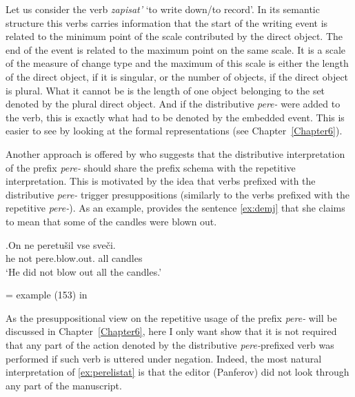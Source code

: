 Let us consider the verb \textit{zapisat'} `to write down/to record'. In its semantic structure this verbs carries information that the start of the writing event is related to the minimum point of the scale contributed by the direct object. The end of the event is related to the maximum point on the same scale. It is a scale of the measure of change type and the maximum of this scale is either the length of the direct object, if it is singular, or the number of objects, if the direct object is plural. What it cannot be is the length of one object belonging to the set denoted by the plural direct object. And if the distributive \textit{pere-} were added to the verb, this is exactly what had to be denoted by the embedded event. This is easier to see by looking at the formal representations (see Chapter~\ref{Chapter6}).

Another approach is offered by \citet{Demjjanow:97} who suggests that the distributive interpretation of the prefix \textit{pere-} should share the prefix schema with the repetitive interpretation. This is motivated by the idea that verbs prefixed with the distributive \textit{pere-} trigger presuppositions (similarly to the verbs prefixed with the repetitive \textit{pere-}). As an example, \citet{Demjjanow:97} provides the sentence \ref{ex:demj} that she claims to mean that some of the candles were blown out.

\exg.\label{ex:demj}On ne peretu\v{s}il vse sve\v{c}i.\\
he not pere.blow.out. all candles\\
\vspace{0.5em}
`He did not blow out all the candles.'\\
\begin{flushright}
\vspace{-0.5em}
= example (153) in \citealt[120]{Demjjanow:97}
\end{flushright}

As the presuppositional view on the repetitive usage of the prefix \textit{pere-} will be discussed in Chapter~\ref{Chapter6}, here I only want show that it is not required that any part of the action denoted by the distributive \textit{pere-}prefixed verb was performed if such verb is uttered under negation. Indeed, the most natural interpretation of \ref{ex:perelistat} is that the editor (Panferov) did not look through any part of the manuscript.

